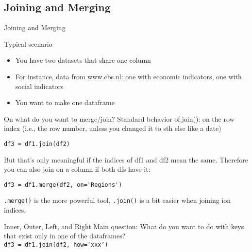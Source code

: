 \subsection{Joining and Merging}

\begin{frame}{Joining and Merging}
\begin{block}{Typical scenario}
	\begin{itemize}
		\item You have two datasets that share one column
		\item For instance, data from \url{www.cbs.nl}: one with economic indicators, one with social indicators
		\item You want to make one dataframe
	\end{itemize}
\end{block}
\end{frame}




{
	\begin{frame}[plain]
\end{frame}
	\begin{frame}[plain]
\end{frame}
}

\begin{frame}[fragile]{On what do you want to merge/join?}
Standard behavior of.join(): on the row index  (i.e., the row number, unless
you changed it to sth else like a date)
\begin{lstlisting}
df3 = df1.join(df2)
\end{lstlisting}
\pause
But that’s only meaningful if the indices of df1 and df2 mean the same. Therefore you can also join on a column if both dfs have it:
\begin{lstlisting}
df3 = df1.merge(df2, on='Regions')
\end{lstlisting}
\pause
\texttt{.merge()} is the more powerful tool, \texttt{.join()} is a bit easier when joining ion indices.
\end{frame}

\begin{frame}[fragile]{Inner, Outer, Left, and Right}
Main question: What do you want to do with keys that exist only in one of the  dataframes? \\
\pause
\vfill
\texttt{df3 = df1.join(df2, how='xxx')}\\
\vfill

\end{frame}




